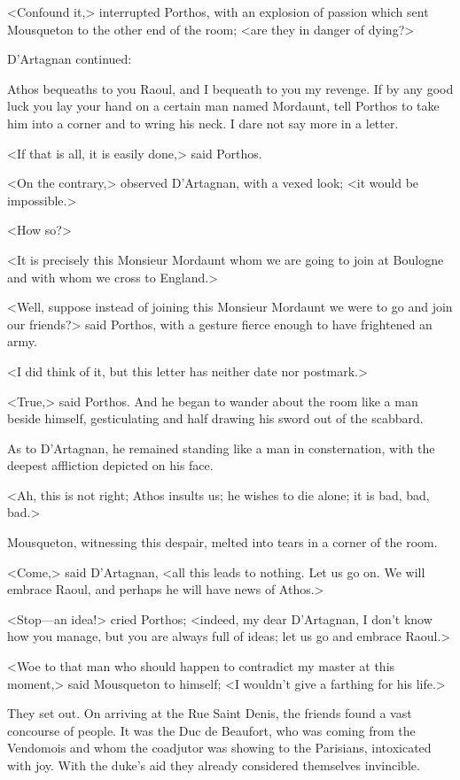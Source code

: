 <Confound it,> interrupted Porthos, with an explosion of passion which sent Mousqueton to the other end of the room; <are they in danger of dying?>

D'Artagnan continued:

\begin{mail}{}{}
Athos bequeaths to you Raoul, and I bequeath to you my revenge. If by any good luck you lay your hand on a certain man named Mordaunt, tell Porthos to take him into a corner and to wring his neck. I dare not say more in a letter.
\end{mail}

<If that is all, it is easily done,> said Porthos.

<On the contrary,> observed D'Artagnan, with a vexed look; <it would be impossible.>

<How so?>

<It is precisely this Monsieur Mordaunt whom we are going to join at Boulogne and with whom we cross to England.>

<Well, suppose instead of joining this Monsieur Mordaunt we were to go and join our friends?> said Porthos, with a gesture fierce enough to have frightened an army.

<I did think of it, but this letter has neither date nor postmark.>

<True,> said Porthos. And he began to wander about the room like a man beside himself, gesticulating and half drawing his sword out of the scabbard.

As to D'Artagnan, he remained standing like a man in consternation, with the deepest affliction depicted on his face.

<Ah, this is not right; Athos insults us; he wishes to die alone; it is bad, bad, bad.>

Mousqueton, witnessing this despair, melted into tears in a corner of the room.

<Come,> said D'Artagnan, <all this leads to nothing. Let us go on. We will embrace Raoul, and perhaps he will have news of Athos.>

<Stop—an idea!> cried Porthos; <indeed, my dear D'Artagnan, I don't know how you manage, but you are always full of ideas; let us go and embrace Raoul.>

<Woe to that man who should happen to contradict my master at this moment,> said Mousqueton to himself; <I wouldn't give a farthing for his life.>

They set out. On arriving at the Rue Saint Denis, the friends found a vast concourse of people. It was the Duc de Beaufort, who was coming from the Vendomois and whom the coadjutor was showing to the Parisians, intoxicated with joy. With the duke's aid they already considered themselves invincible.

